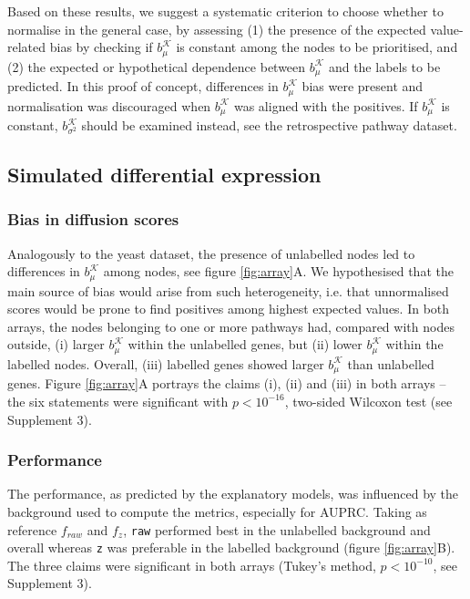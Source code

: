 \documentclass[final]{bioinfo}
\newcommand{\method}{\texttt}
\newcommand{\ebias}{b_{\mu}^{\mathcal{K}}}
\newcommand{\vbias}{b_{\sigma^2}^{\mathcal{K}}}
\begin{document}
Based on these results, we suggest a systematic criterion to choose whether to normalise in the general case, by assessing (1) the presence of the expected value-related bias by checking if $\ebias$ is constant among the nodes to be prioritised, and (2) the expected or hypothetical dependence between $\ebias$ and the labels to be predicted. 
In this proof of concept, differences in $\ebias$ bias were present and normalisation was discouraged when $\ebias$ was aligned with the positives.
If $\ebias$ is constant, $\vbias$ should be examined instead, see the retrospective pathway dataset. 

\subsection*{Simulated differential expression}

\subsubsection*{Bias in diffusion scores}

Analogously to the yeast dataset, the presence of unlabelled nodes led to differences in $\ebias$ among nodes, see figure \ref{fig:array}A. 
We hypothesised that the main source of bias would arise from such heterogeneity, i.e. that unnormalised scores would be prone to find positives among highest expected values. 
In both arrays, the nodes belonging to one or more pathways had, compared with nodes outside, (i) larger $\ebias$ within the unlabelled genes, but (ii) lower $\ebias$ within the labelled nodes. 
Overall, (iii) labelled genes showed larger $\ebias$ than unlabelled genes.
Figure \ref{fig:array}A portrays the claims (i), (ii) and (iii) in both arrays -- the six statements were significant with $p<10^{-16}$, two-sided Wilcoxon test (see Supplement 3). 

\subsubsection*{Performance}

The performance, as predicted by the explanatory models, was influenced by the background used to compute the metrics, especially for AUPRC. 
Taking as reference $f_{raw}$ and $f_z$, \method{raw} performed best in the unlabelled background and overall whereas \method{z} was preferable in the labelled background (figure \ref{fig:array}B). 
The three claims were significant in both arrays (Tukey's method, $p<10^{-10}$, see Supplement 3).
\end{document}

